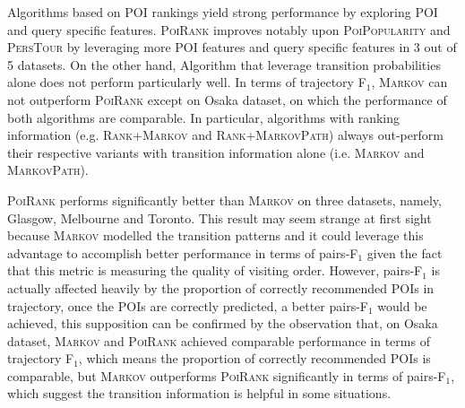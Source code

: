 Algorithms based on POI rankings yield strong performance
by exploring POI and query specific features.
%
\textsc{PoiRank} improves notably upon \textsc{PoiPopularity} and \textsc{PersTour}
 by leveraging more POI features and query specific features in 3 out of 5 datasets.
On the other hand, Algorithm that leverage transition probabilities alone does not perform particularly well.
%
In terms of trajectory F$_1$,
\textsc{Markov} can not outperform \textsc{PoiRank} except on Osaka dataset,
on which the performance of both algorithms are comparable.
In particular, algorithms with ranking information (e.g. \textsc{Rank+Markov} and \textsc{Rank+MarkovPath}) 
always out-perform their respective variants with transition information alone (i.e. \textsc{Markov} and \textsc{MarkovPath}).

\textsc{PoiRank} performs significantly better than \textsc{Markov} on three datasets, namely,
Glasgow, Melbourne and Toronto.
%
This result may seem strange at first sight because \textsc{Markov} modelled the transition patterns and it could leverage
this advantage to accomplish better performance in terms of pairs-F$_1$ given the fact that this metric is measuring the quality
of visiting order.
However, pairs-F$_1$ is actually affected heavily by the proportion of correctly recommended POIs in trajectory,
once the POIs are correctly predicted, a better pairs-F$_1$ would be achieved,
this supposition can be confirmed by the observation that, on Osaka dataset, \textsc{Markov} and \textsc{PoiRank} achieved
comparable performance in terms of trajectory F$_1$, which means the proportion of correctly recommended POIs is comparable,
but \textsc{Markov} outperforms \textsc{PoiRank} significantly in terms of pairs-F$_1$,
which suggest the transition information is helpful in some situations.

